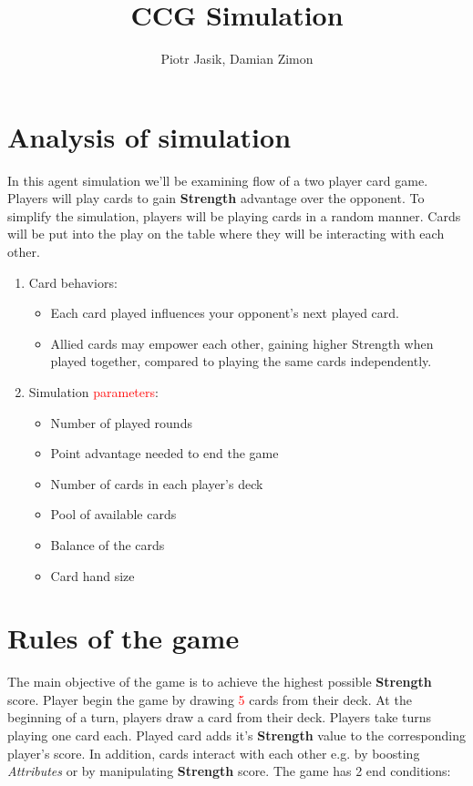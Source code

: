 
\title{CCG Simulation}
\author{Piotr Jasik, Damian Zimon}


\maketitle

\clearpage

\section{Analysis of simulation}
In this agent simulation we'll be examining flow of a two player card game. Players will play cards to gain \textbf{Strength} advantage over the opponent. To simplify the simulation, players will be playing cards in a random manner. Cards will be put into the play on the table where they will be interacting with each other.

\begin{enumerate}
    \item Card behaviors:
    \begin{itemize}
        \item Each card played influences your opponent's next played card.
        \item Allied cards may empower each other, gaining higher Strength when played together, compared to playing the same cards independently.
    \end{itemize}
    \item Simulation \textcolor{red}{parameters}:
    \begin{itemize}
        \item Number of played rounds
        \item Point advantage needed to end the game
        \item Number of cards in each player's deck
        \item Pool of available cards
        \item Balance of the cards
        \item Card hand size
    \end{itemize}
\end{enumerate}

\section{Rules of the game}

    The main objective of the game is to achieve the highest possible \textbf{Strength} score. 
    Player begin the game by drawing \textcolor{red}{5} cards from their deck.
    At the beginning of a turn, players draw a card from their deck.
    Players take turns playing one card each.
    Played card adds it's \textbf{Strength} value to the corresponding player's score. 
    In addition, cards interact with each other e.g. by boosting \textit{Attributes} or by manipulating \textbf{Strength} score. 
    The game has 2 end conditions: 
    
